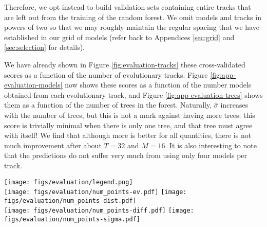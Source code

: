 \documentclass[twocolumn,twocolappendix]{aastex6}
\begin{document}
Therefore, we opt instead to build validation sets containing entire tracks that are left out from the training of the random forest. We omit models and tracks in powers of two so that we may roughly maintain the regular spacing that we have established in our grid of models (refer back to Appendices \ref{sec:grid} and \ref{sec:selection} for details). 

We have already shown in Figure \ref{fig:evaluation-tracks} these cross-validated scores as a function of the number of evolutionary tracks. Figure \ref{fig:app-evaluation-models} now shows these scores as a function of the number models obtained from each evolutionary track, and Figure \ref{fig:app-evaluation-trees} shows them as a function of the number of trees in the forest. Naturally, $\hat\sigma$ increases with the number of trees, but this is not a mark against having more trees: this score is trivially minimal when there is only one tree, and that tree must agree with itself! We find that although more is better for all quantities,  there is not much improvement after about $T=32$ and $M=16$. It is also interesting to note that the predictions do not suffer very much from using only four models per track. 

\begin{figure*}
    \centering
    \texttt{[image: figs/evaluation/legend.png]}\\
    \texttt{[image: figs/evaluation/num\_points-ev.pdf]}%
    \texttt{[image: figs/evaluation/num\_points-dist.pdf]}\\
    \texttt{[image: figs/evaluation/num\_points-diff.pdf]}%
    \texttt{[image: figs/evaluation/num\_points-sigma.pdf]}\\
    \caption{%
    Explained variance (top left), accuracy per precision distance (top right), normalized absolute error (bottom left), and normalized model uncertainty (bottom right) for each stellar parameter as a function of the number of models per evolutionary track.} 
    \label{fig:app-evaluation-models}
\end{figure*}
\end{document}
